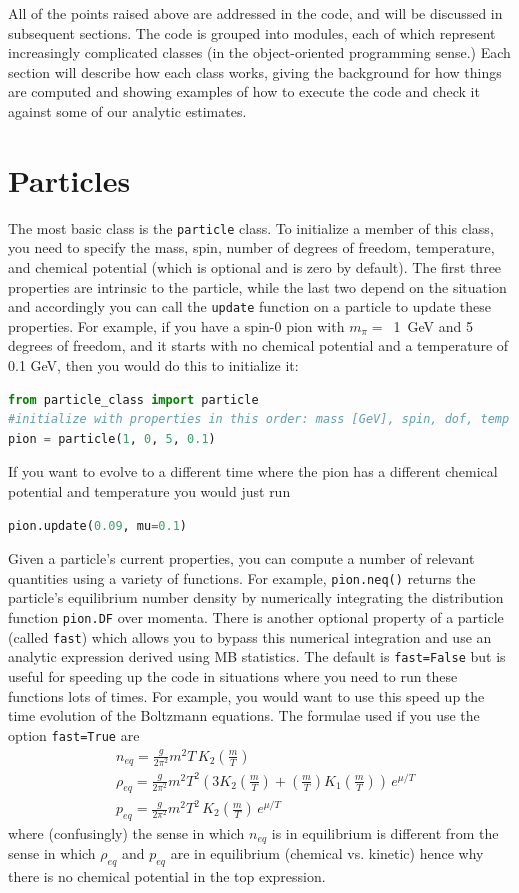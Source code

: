 \documentclass[superscriptaddress,nofootinbib,notitlepage,onecolumn]{revtex4-1}
\newcommand{\code}[1]{\texttt{#1}}
\begin{document}
All of the points raised above are addressed in the code, and will be discussed in subsequent sections. The code is grouped into modules, each of which represent increasingly complicated classes (in the object-oriented programming sense.) Each section will describe how each class works, giving the background for how things are computed and showing examples of how to execute the code and check it against some of our analytic estimates.

\section{Particles}
The most basic class is the \verb|particle| class. To initialize a member of this class, you need to specify the mass, spin, number of degrees of freedom, temperature, and chemical potential (which is optional and is zero by default). The first three properties are intrinsic to the particle, while the last two depend on the situation and accordingly you can call the \verb|update| function on a particle to update these properties. For example, if you have a spin-0 pion with $m_\pi = $~1~GeV and 5 degrees of freedom, and it starts with no chemical potential and a temperature of 0.1 GeV, then you would do this to initialize it:
\begin{lstlisting}[language=Python]
from particle_class import particle
#initialize with properties in this order: mass [GeV], spin, dof, temp [GeV]
pion = particle(1, 0, 5, 0.1)
\end{lstlisting}
If you want to evolve to a different time where the pion has a different chemical potential and temperature you would just run 
\begin{lstlisting}[language=Python]
pion.update(0.09, mu=0.1)
\end{lstlisting}
Given a particle's current properties, you can compute a number of relevant quantities using a variety of functions. For example, \code{pion.neq()} returns the particle's equilibrium number density by numerically integrating the distribution function \code{pion.DF} over momenta.
There is another optional property of a particle (called \code{fast}) which allows you to bypass this numerical integration and use an analytic expression derived using MB statistics. The default is \code{fast=False} but is useful for speeding up the code in situations where you need to run these functions lots of times. For example, you would want to use this speed up the time evolution of the Boltzmann equations. The formulae used if you use the option \code{fast=True} are
\begin{align}
&n_{eq} = \frac{g}{2 \pi^2} m^2 T\, K_2\left(\frac{m}{T}\right) \label{neq}\\
&\rho_{eq} =  \frac{g}{2 \pi^2} m^2 T^2 \left( 3 K_2\left(\frac{m}{T}\right) + \left(\frac{m}{T}\right)K_1\left(\frac{m}{T}\right)\right)\,e^{\mu/T}  \\
&p_{eq} =  \frac{g}{2 \pi^2} m^2 T^2\, K_2\left(\frac{m}{T}\right)\,e^{\mu/T}
\label{peq}
\end{align}
where (confusingly) the sense in which $n_{eq}$ is in equilibrium is different from the sense in which $\rho_{eq}$ and $p_{eq}$ are in equilibrium (chemical vs. kinetic) hence why there is no chemical potential in the top expression.
\end{document}
